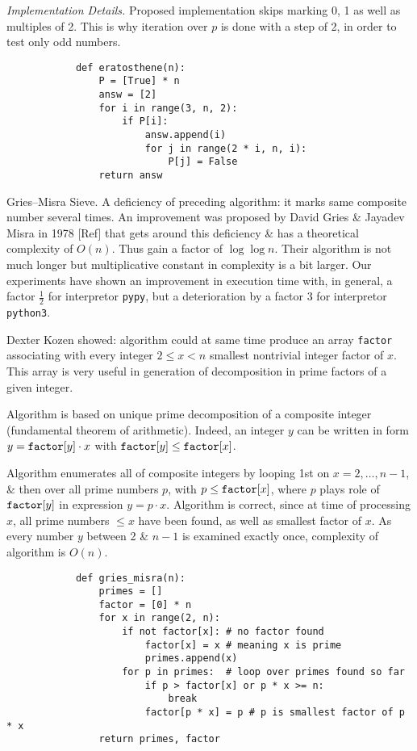 \documentclass{article}
\begin{document}
\begin{itemize}
\begin{itemize}
		{\it Implementation Details.} Proposed implementation skips marking 0, 1 as well as multiples of 2. This is why iteration over $p$ is done with a step of 2, in order to test only odd numbers.
		\begin{verbatim}
			def eratosthene(n):
			    P = [True] * n
			    answ = [2]
			    for i in range(3, n, 2):
			        if P[i]:
			            answ.append(i)
			            for j in range(2 * i, n, i):
			                P[j] = False
			    return answ
		\end{verbatim}
		{\sf Gries--Misra Sieve.} A deficiency of preceding algorithm: it marks same composite number several times. An improvement was proposed by {\sc David Gries \& Jayadev Misra} in 1978 [Ref] that gets around this deficiency \& has a theoretical complexity of $O(n)$. Thus gain a factor of $\log\log n$. Their algorithm is not much longer but multiplicative constant in complexity is a bit larger. Our experiments have shown an improvement in execution time with, in general, a factor $\frac{1}{2}$ for interpretor {\tt pypy}, but a deterioration by a factor 3 for interpretor {\tt python3}.
		
		{\sc Dexter Kozen} showed: algorithm could at same time produce an array {\tt factor} associating with every integer $2\le x < n$ smallest nontrivial integer factor of $x$. This array is very useful in generation of decomposition in prime factors of a given integer.
		
		Algorithm is based on unique prime decomposition of a composite integer (fundamental theorem of arithmetic). Indeed, an integer $y$ can be written in form $y = {\tt factor}[y]\cdot x$ with ${\tt factor}[y]\le{\tt factor}[x]$.
		
		Algorithm enumerates all of composite integers by looping 1st on $x = 2,\ldots,n - 1$, \& then over all prime numbers $p$, with $p\le{\tt factor}[x]$, where $p$ plays role of ${\tt factor}[y]$ in expression $y = p\cdot x$. Algorithm is correct, since at time of processing $x$, all prime numbers $\le x$ have been found, as well as smallest factor of $x$. As every number $y$ between 2 \& $n - 1$ is examined exactly once, complexity of algorithm is $O(n)$.
		\begin{verbatim}
			def gries_misra(n):
			    primes = []
			    factor = [0] * n
			    for x in range(2, n):
			        if not factor[x]: # no factor found
			            factor[x] = x # meaning x is prime
			            primes.append(x)
			        for p in primes:  # loop over primes found so far
			            if p > factor[x] or p * x >= n:
			                break
			            factor[p * x] = p # p is smallest factor of p * x
			    return primes, factor
		\end{verbatim}
		

\end{itemize}
\end{itemize}
\end{document}
